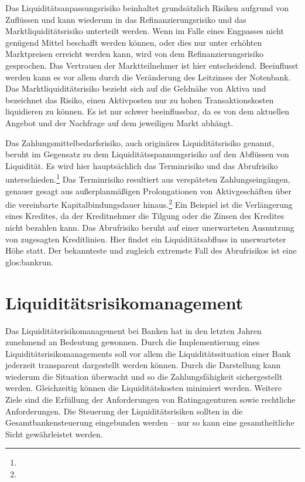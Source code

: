\begin{onehalfspacing}
Das Liquiditätsanpassungsrisiko beinhaltet grundsätzlich Risiken aufgrund von Zuflüssen und kann wiederum in das Refinanzierungsrisiko und das Marktliquiditätsrisiko unterteilt werden. Wenn im Falle eines Engpasses nicht genügend Mittel beschafft werden können, oder dies nur unter erhöhten Marktpreisen erreicht werden kann, wird von dem Refinanzierungsrisiko gesprochen. Das Vertrauen der Marktteilnehmer ist hier entscheidend. Beeinflusst werden kann es vor allem durch die Veränderung des Leitzinses der Notenbank. Das Marktliquiditätsrisiko bezieht sich auf die Geldnähe von Aktiva und bezeichnet das Risiko, einen Aktivposten nur zu hohen Transaktionskosten liquidieren zu können. Es ist nur schwer beeinflussbar, da es von dem aktuellen Angebot und der Nachfrage auf dem jeweiligen Markt abhängt.

Das Zahlungsmittelbedarfsrisiko, auch originäres Liquiditätsrisiko genannt, beruht im Gegensatz zu dem Liquiditätsspannungsrisiko auf den Abflüssen von Liquidität. Es wird hier hauptsächlich das Terminrisiko und das Abrufrisiko unterschieden.\footnote{ } Das Terminrisiko resultiert aus verspäteten Zahlungseingängen, genauer gesagt aus außerplanmäßigen Prolongationen von Aktivgeschäften über die vereinbarte Kapitalbindungsdauer hinaus.\footnote{ } Ein Beispiel ist die Verlängerung eines Kredites, da der Kreditnehmer die Tilgung oder die Zinsen des Kredites nicht bezahlen kann. Das Abrufrisiko beruht auf einer unerwarteten Ausnutzung von zugesagten Kreditlinien. Hier findet ein Liquiditätsabfluss in unerwarteter Höhe statt. Der bekannteste und zugleich extremste Fall des Abrufrisikos ist eine \gls{glos:bankrun}.


\section{Liquiditätsrisikomanagement}
Das Liquiditätsrisikomanagement bei Banken hat in den letzten Jahren zunehmend an Bedeutung gewonnen. Durch die Implementierung eines Liquiditätsrisikomanagements soll vor allem die Liquiditätssituation einer Bank jederzeit transparent dargestellt werden können. Durch die Darstellung kann wiederum die Situation überwacht und so die Zahlungsfähigkeit sichergestellt werden. Gleichzeitig können die Liquiditätskosten minimiert werden. Weitere Ziele sind die Erfüllung der Anforderungen von Ratingagenturen sowie rechtliche Anforderungen. Die Steuerung der Liquiditätsrisiken sollten in die Gesamtbankensteuerung eingebunden werden -- nur so kann eine gesamtheitliche Sicht gewährleistet werden.


\end{onehalfspacing}
